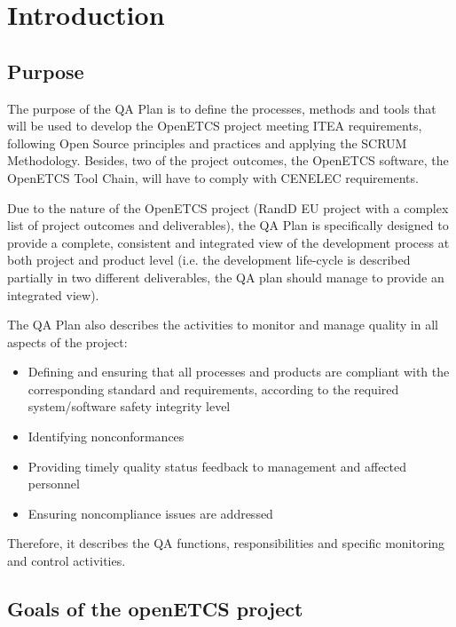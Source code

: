 \documentclass{template/openetcs_article}
\begin{document}
\newpage



\section[Introduction]{Introduction}


\subsection{Purpose}

The purpose of the QA Plan is to define the processes, methods and tools that will be used to develop the OpenETCS project meeting ITEA requirements, following Open Source principles and practices and applying the SCRUM Methodology. Besides, two of the project outcomes, the OpenETCS software, the OpenETCS Tool Chain, will have to comply with CENELEC requirements.

Due to the nature of the OpenETCS project (\gls{RandD} EU project with a complex list of project outcomes and deliverables), the QA Plan is specifically designed to provide a complete, consistent and integrated view of the development process at both project and product level (i.e. the development life-cycle is described partially in two different deliverables, the QA plan should manage to provide an integrated view).

The QA Plan also describes the activities to monitor and manage quality in all aspects of the project:

\begin{itemize}
\item Defining and ensuring that all processes and products are compliant with the corresponding standard and requirements, according to the required system/software safety integrity level
\item Identifying nonconformances
\item Providing timely quality status feedback to management and affected personnel
\item Ensuring noncompliance issues are addressed
\end{itemize}

Therefore, it describes the QA functions, responsibilities and specific monitoring and control activities.


\subsection{Goals of the openETCS project}
\end{document}
